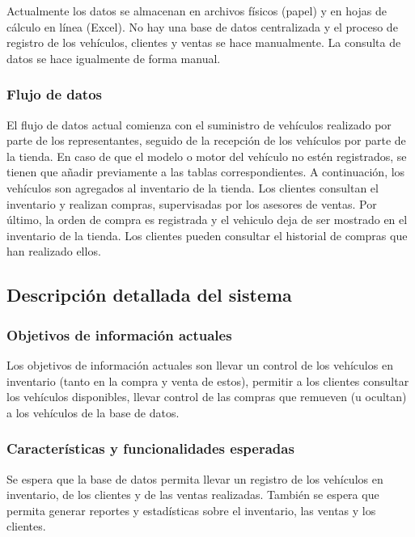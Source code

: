 \documentclass[12pt]{article}
\begin{document}
Actualmente los datos se almacenan en archivos físicos (papel) y en hojas de cálculo en línea (Excel). No hay una base de datos centralizada y el proceso de registro de los vehículos, clientes y ventas se hace manualmente. La consulta de datos se hace igualmente de forma manual.

\subsubsection{Flujo de datos}

El flujo de datos actual comienza con el suministro de vehículos realizado por parte de los representantes, seguido de la recepción de los vehículos por parte de la tienda. En caso de que el modelo o motor del vehículo no estén registrados, se tienen que añadir previamente a las tablas correspondientes. A continuación, los vehículos son agregados al inventario de la tienda. Los clientes consultan el inventario y realizan compras, supervisadas por los asesores de ventas. Por último, la orden de compra es registrada y el vehiculo deja de ser mostrado en el inventario de la tienda. Los clientes pueden consultar el historial de compras que han realizado ellos.

\subsection{Descripci\'on detallada del sistema}

\subsubsection{Objetivos de información actuales}

Los objetivos de información actuales son llevar un control de los vehículos en inventario (tanto en la compra y venta de estos), permitir a los clientes consultar los vehículos disponibles, llevar control de las compras que remueven (u ocultan) a los vehículos de la base de datos.

\subsubsection{Caracter\'isticas y funcionalidades esperadas}

Se espera que la base de datos permita llevar un registro de los vehículos en inventario, de los clientes y de las ventas realizadas. También se espera que permita generar reportes y estadísticas sobre el inventario, las ventas y los clientes.
\end{document}
